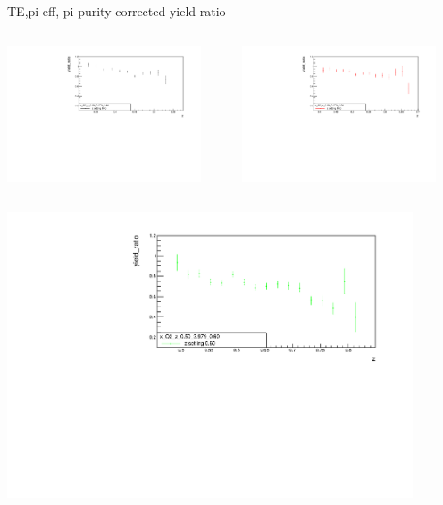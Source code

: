 \begin{frame}{TE,pi eff, pi purity corrected yield ratio}
\begin{columns}
\begin{column}[T]{0.5\textwidth}
\includegraphics[width = 0.9\textwidth]{results/yield/statistics_corr/x_Q2_z_0.50_3.979_0.40_ratio.pdf}
\end{column}
\begin{column}[T]{0.5\textwidth}
\includegraphics[width = 0.9\textwidth]{results/yield/statistics_corr/x_Q2_z_0.50_3.979_0.50_ratio.pdf}
\end{column}
\end{columns}
\begin{columns}
\begin{column}[T]{0.5\textwidth}
\includegraphics[width = 0.9\textwidth]{results/yield/statistics_corr/x_Q2_z_0.50_3.979_0.60_ratio.pdf}

\end{column}
\end{columns}
\end{frame}

